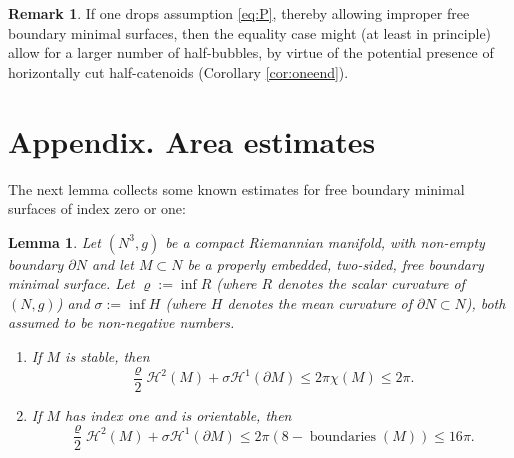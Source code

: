 \documentclass[10pt]{amsart}
\newcounter{cas}
\DeclareMathOperator{\boundaries}{boundaries}
\newtheorem{lem}[thm]{Lemma}
\theoremstyle{definition}
\newtheorem{rmk}[thm]{Remark}
\newcommand{\h}{\mathscr{H}}
\begin{document}
\begin{rmk}
If one drops assumption \eqref{eq:P}, thereby allowing improper free boundary minimal surfaces, then the equality case might (at least in principle) allow for a larger number of half-bubbles, by virtue of the potential presence of horizontally cut half-catenoids (\cf Corollary \ref{cor:oneend}).
\end{rmk}

\appendix

\section*{Appendix. Area estimates}\label{sec:area}

The next lemma collects some known estimates for free boundary minimal surfaces of index zero or one:

\begin{lem}\label{lem:stable}
Let $(N^3,g)$ be a compact Riemannian manifold, with non-empty boundary $\partial N$ and let $M\subset N$ be a properly embedded, two-sided, free boundary minimal surface. Let $\varrho:=\inf R$ (where $R$ denotes the scalar curvature of $(N,g)$) and $\sigma:=\inf H$ (where $H$ denotes the mean curvature of $\partial N\subset N$), both assumed to be non-negative numbers.
\begin{enumerate}
\item\label{lem:stable1}
If $M$ is stable, then
\[
\frac{\varrho}{2}\h^2(M)+\sigma\h^1(\partial M)\leq 2\pi\chi(M)\leq 2\pi.
\]
\item\label{lem:stable2}
If $M$ has index one and is orientable, then
\[
\frac{\varrho}{2}\h^2(M)+\sigma\h^1(\partial M)\leq 2\pi (8-\boundaries(M))\leq 16\pi.
\]
\end{enumerate}
\end{lem}
\end{document}
